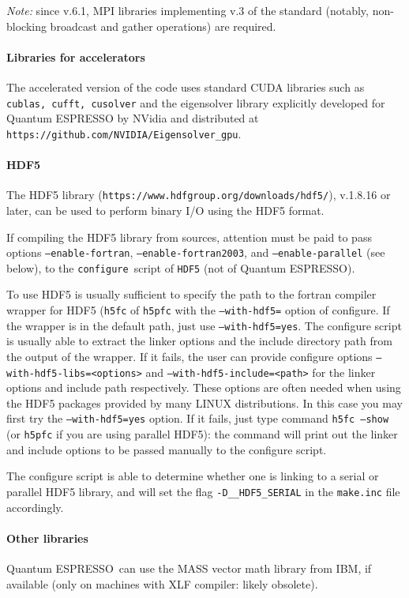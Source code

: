 \documentclass[12pt,a4paper]{article}
\def\qe{{\sc Quantum ESPRESSO}}
\def\configure{\texttt{configure}}
\begin{document}
{\em Note:} since v.6.1, MPI libraries implementing v.3 of the standard
(notably, non-blocking broadcast and gather operations) are required.

\paragraph{Libraries for accelerators}
The accelerated version of the code uses standard CUDA libraries such as
\texttt{cublas, cufft, cusolver} and the eigensolver library explicitly 
developed for \qe{} by NVidia and distributed at \texttt{https://github.com/NVIDIA/Eigensolver\_gpu}.

\paragraph {HDF5}
The HDF5 library (\texttt{https://www.hdfgroup.org/downloads/hdf5/}),
v.1.8.16 or later, can be used to perform binary I/O using the HDF5
format.

If compiling the HDF5 library from sources, attention must be paid
to pass options \texttt{--enable-fortran},
\texttt{--enable-fortran2003}, and \texttt{--enable-parallel} (see below),
to the \configure{}ript of \texttt{HDF5} (not of \qe). 

To use HDF5 is usually sufficient to specify the path to the fortran 
compiler wrapper for HDF5 (\texttt{h5fc} of \texttt{h5pfc} with the 
\texttt{--with-hdf5=} option of configure. If the wrapper is in the 
default path, just use \texttt{--with-hdf5=yes}.  
The configure script is usually able to extract the linker options
and the include directory path from the output of the wrapper. If it 
fails, the user can provide configure options 
\texttt{--with-hdf5-libs=<options>} and \texttt{--with-hdf5-include=<path>} 
for the linker options and include path respectively. 
These options are often needed when using the HDF5 packages 
provided by many LINUX distributions. In this case you may first try 
the \texttt{--with-hdf5=yes} option. If it fails, just type command
\texttt{h5fc --show} (or \texttt{h5pfc} if you are using parallel HDF5):
the command will print out the linker and include options to be passed 
manually to the configure script.

The configure script is able to determine whether one is linking to a 
serial or parallel HDF5 library, and will  set the flag 
\texttt{-D\_\_HDF5\_SERIAL} in the \texttt{make.inc} file accordingly. 


\paragraph{Other libraries}
\qe\ can use the MASS vector math
library from IBM, if available (only on machines with XLF compiler:
likely obsolete).
\end{document}
